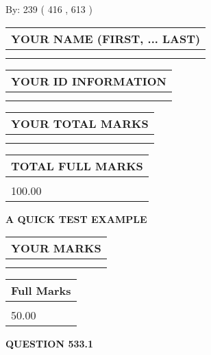 \documentclass[12pt]{article}
\begin{document}
   
\hspace{1.0in} By: 
 239 ( 416 ,  613 )
   
   
   
   
\newpage 
\setcounter{page}{ 
   533001 } 
   
   
   
   
\noindent\begin{tabular}{|l|}
\hline
YOUR NAME (FIRST, ... LAST)  \\
\hline
 \\ 
 \\ 
\hline
\end{tabular}
\hspace{0.05in} \begin{tabular}{|l|}
\hline
 YOUR   ID   INFORMATION  \\
\hline
 \\ 
 \\ 
\hline
\end{tabular}
   
   
\vspace{0.2in}\noindent\begin{tabular}{|l|}
\hline
YOUR TOTAL MARKS  \\
\hline
 \\ 
 \\ 
\hline
\end{tabular}
\hspace{0.05in} \begin{tabular}{|l|}
\hline
TOTAL FULL MARKS  \\
\hline
 \\ 
100.00 \\
\hline
\end{tabular}
   
   
 \vspace{0.2in}
{\LARGE {\textbf{ A QUICK TEST EXAMPLE}}}
   
   
  
\vspace{0.2in}
  
\noindent\begin{tabular}{|l|}
\hline
 YOUR MARKS  \\
\hline
 \\ 
 \\ 
\hline
\end{tabular}
\hspace{0.05in} \begin{tabular}{|l|}
\hline
 Full Marks  \\
\hline
 \\ 
50.00 \\
\hline
\end{tabular}
{\textbf{\Large{QUESTION
533.1 
}}}
  
\end{document}
